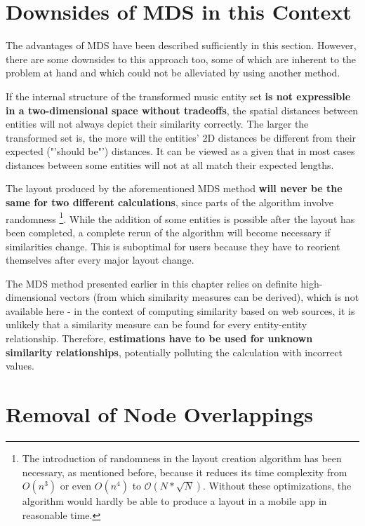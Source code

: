\section{Downsides of MDS in this Context}

The advantages of MDS have been described sufficiently in this section. However, there are some downsides to this approach too, some of which are inherent to the problem at hand and which could not be alleviated by using another method.

If the internal structure of the transformed music entity set \textbf{is not expressible in a two-dimensional space without tradeoffs}, the spatial distances between entities will not always depict their similarity correctly. The larger the transformed set is, the more will the entities' 2D distances be different from their expected ("'should be"') distances. It can be viewed as a given that in most cases distances between some entities will not at all match their expected lengths.

The layout produced by the aforementioned MDS method \textbf{will never be the same for two different calculations}, since parts of the algorithm involve randomness 
\footnote{The introduction of randomness in the layout creation algorithm has been necessary, as mentioned before, because it reduces its time complexity from $O(n^3)$ or even $O(n^4)$ to $\mathcal O(N*\sqrt{N})$. Without these optimizations, the algorithm would hardly be able to produce a layout in a mobile app in reasonable time.}.
While the addition of some entities is possible after the layout has been completed, a complete rerun of the algorithm will become necessary if similarities change. This is suboptimal for users because they have to reorient themselves after every major layout change.

The MDS method presented earlier in this chapter relies on definite high-dimensional vectors (from which similarity measures can be derived), which is not available here - in the context of computing similarity based on web sources, it is unlikely that a similarity measure can be found for every entity-entity relationship. Therefore, \textbf{estimations have to be used for unknown similarity relationships}, potentially polluting the calculation with incorrect values.

\section{Removal of Node Overlappings}
\label{sec:removal-node-overlapping}

